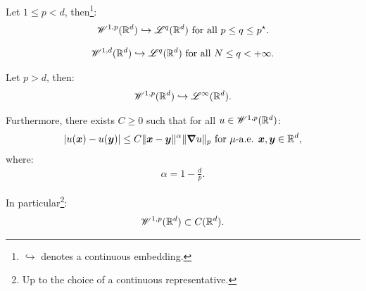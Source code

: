 \begin{corollary}
    Let $1 \leq p < d$, then\footnote{$\hookrightarrow$ denotes a continuous embedding.}:
    \begin{gather}
        \mathscr{W}^{1, p}(\mathbb{R}^{d}) \hookrightarrow \mathscr{L}^{q}(\mathbb{R}^{d}) \text{ for all } p \leq q \leq p^{\star}.
    \end{gather}
\end{corollary}

\begin{corollary}
    \begin{gather}
        \mathscr{W}^{1, d}(\mathbb{R}^{d}) \hookrightarrow \mathscr{L}^{q}(\mathbb{R}^{d}) \text{ for all } N \leq q < +\infty.
    \end{gather}
\end{corollary}

\begin{theorem}
    Let $p > d$, then:
    \begin{gather}
        \mathscr{W}^{1, p}(\mathbb{R}^{d}) \hookrightarrow \mathscr{L}^{\infty}(\mathbb{R}^{d}).
    \end{gather}

    Furthermore, there exists $C \geq 0$ such that for all $u \in \mathscr{W}^{1, p}(\mathbb{R}^{d})$:
    \begin{gather}
        \lvert u(\bm{x}) - u(\bm{y}) \rvert \leq C \lVert \bm{x} - \bm{y} \rVert^{\alpha} \lVert \bm{\nabla} u \rVert_p \text{ for } \mu \text{-a.e. } \bm{x}, \bm{y} \in \mathbb{R}^{d},
    \end{gather}
    where:
    \begin{gather}
        \alpha = 1 - \frac{d}{p}.
    \end{gather}

    In particular\footnote{Up to the choice of a continuous representative.}:
    \begin{gather}
        \mathscr{W}^{1, p}(\mathbb{R}^{d}) \subset C(\mathbb{R}^{d}).
    \end{gather}
\end{theorem}

